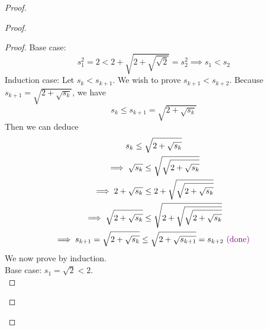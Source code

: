\documentclass{report}
\begin{document}
\begin{proof}
\begin{proof}
\begin{proof}
Base case:
\begin{equation}
s_1^2=2<2+\sqrt{2+\sqrt{\sqrt{2} } }=s_2^2 \implies s_1<s_2
\end{equation}
Induction case: Let $s_k<s_{k+1}$. We wish to prove $s_{k+1}<s_{k+2}$. Because $s_{k+1}=\sqrt{2+\sqrt{s_k} } $, we have
\begin{equation}
s_k\leq s_{k+1}=\sqrt{2+\sqrt{s_k} } 
\end{equation}
Then we can deduce
\begin{gather}
s_k\leq \sqrt{2+\sqrt{s_k} } \\
\implies \sqrt{s_k}\leq \sqrt{\sqrt{2+\sqrt{s_k} } }\\
\implies 2+\sqrt{s_k}\leq 2+\sqrt{\sqrt{2+\sqrt{s_k} } }\\
\implies \sqrt{2+\sqrt{s_k} }\leq \sqrt{2+\sqrt{\sqrt{2+\sqrt{s_k} } } }\\
\implies s_{k+1}=\sqrt{2+\sqrt{s_k} }\leq \sqrt{2+\sqrt{s_{k+1}} }=s_{k+2}\textcolor{violet}{\text{ (done) }}
\end{gather}
We now prove  by induction.\\

Base case: $s_1=\sqrt{2}<2$.\\


\end{proof}
\end{proof}
\end{proof}
\end{document}
